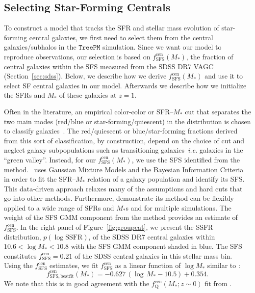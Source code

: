 \documentclass[12pt, letterpaper, preprint, tighten]{aastex62}
\newcommand{\beq}{\begin{equation}}
\newcommand{\eeq}{\end{equation}}
\begin{document}
\subsection{Selecting Star-Forming Centrals}  \label{sec:sfcen}
To construct a model that tracks the SFR and stellar mass evolution of 
star-forming central galaxies, we first need to select them from the 
central galaxies/subhalos in the $\mathtt{TreePM}$ simulation. Since 
we want our model to reproduce observations, our selection is based 
on $f^\mathrm{cen}_\mathrm{SFS}(M_*)$, the fraction of central galaxies 
within the SFS measured from the SDSS DR7 VAGC (Section~\ref{sec:sdss}). 
Below, we describe how we derive $f^\mathrm{cen}_\mathrm{SFS}(M_*)$ and 
use it to select SF central galaxies in our model. Afterwards 
we describe how we initialize the SFRs and $M_*$ of these galaxies at 
$z = 1$.

Often in the literature, an empirical color-color or SFR--$M_*$ cut 
that separates the two main modes (red/blue or star-forming/quiescent) 
in the distribution is chosen to classify 
galaxies~\citep[\emph{e.g.}][]{baldry2006, blanton2009, drory2009, peng2010, moustakas2013, hahn2015}.
The red/quiescent or blue/star-forming fractions derived from this sort 
of classification, by construction, depend on the choice of cut and 
neglect galaxy subpopulations such as transitioning galaxies~\emph{i.e.} 
galaxies in the ``green valley''. Instead, for our $f^\mathrm{cen}_\mathrm{SFS}(M_*)$, 
we use the SFS identified from the \cite{hahn2018a} method. \cite{hahn2018a}~uses Gaussian 
Mixture Models and the Bayesian Information Criteria in order to fit the 
SFR--$M_*$ relation of a galaxy population and identify its SFS. This 
data-driven approach relaxes many of the assumptions and hard cuts that 
go into other methods. Furthermore, \cite{hahn2018a} demonstrate its method can 
be flexibly applied to a wide range of SFRs and $M_*$s and for multiple 
simulations. The weight of the SFS GMM component from the method provides 
an estimate of $f^\mathrm{cen}_\mathrm{SFS}$. In the right panel of 
Figure~\ref{fig:groupcat}, we present the SSFR distribution, $p(\log \mathrm{SSFR})$,
of the SDSS DR7 central galaxies within $10.6 < \log M_* < 10.8$ with 
the SFS GMM component shaded in blue. 
The SFS constitutes $f^\mathrm{cen}_\mathrm{SFS} = 0.21$ of the SDSS 
central galaxies in this stellar mass bin. Using the $f^\mathrm{cen}_\mathrm{SFS}$ 
estimates, we fit $f^\mathrm{cen}_\mathrm{SFS}$ as a linear function of 
$\log M_*$ similar to \cite{wetzel2013,hahn2017b}: 
\beq \label{eq:f_cen_sfms}
f^\mathrm{cen}_\mathrm{SFS, bestfit}(M_*) = -0.627\,(\log\,M_* - 10.5) + 0.354. 
\eeq
We note that this is in good agreement with the $f_\mathrm{Q}^\mathrm{cen}(M_*; z \sim 0)$ 
fit from \cite{hahn2017b}. 
\end{document}
